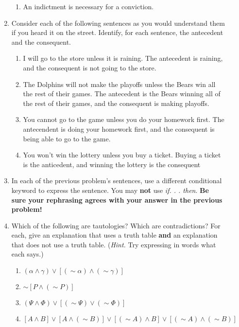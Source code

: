 \documentclass{letter}
\begin{document}
\begin{description}
\begin{enumerate}
\begin{enumerate}
			\item An indictment is necessary for a conviction. \\
		\end{enumerate}
	\item Consider each of the following sentences as you would understand them if you heard it on the street. Identify, for each sentence, the antecedent and the consequent.
			\begin{enumerate}\itemsep=1.25mm
				\item I will go to the store unless it is raining. The antecedent is raining, and the consequent is not going to the store.
				\item The Dolphins will not make the playoffs unless the Bears win all the rest of their games. The antecedent is the Bears winning all of the rest of their games, and the consequent is making playoffs. \\
				\item You cannot go to the game unless you do your homework first. The antecendent is doing your homework first, and the consequent is being able to go to the game. \\
				\item You won't win the lottery unless you buy a ticket. Buying a ticket is the anticedent, and winning the lottery is the consequent
			\end{enumerate}
	\item In each of the previous problem's sentences, use a different conditional keyword to express the sentence. You may {\bfseries not} use {\em if. . . then}. {\bfseries Be sure your rephrasing agrees with your answer in the previous problem!} \\
	\item Which of the following are tautologies? Which are contradictions? For each, give an explanation that uses a truth table {\bfseries and} an explanation that does not use a truth table. ({\em Hint.} Try expressing in words what each says.)
			\begin{enumerate}\itemsep=1.25mm
				\item $(\alpha\wedge \gamma)\vee \left[(\sim \alpha)\wedge(\sim\gamma)\right]$
				\item $\sim\left[P\wedge (\sim P)\right]$
				\item $(\Psi \wedge \Phi)\vee \left[(\sim \Psi)\vee(\sim \Phi)\right]$
				\item $[A\wedge B]\vee [A\wedge (\sim B)] \vee [(\sim A)\wedge B] \vee [(\sim A)\wedge (\sim B)]$
			\end{enumerate}

\end{enumerate}
\end{description}
\end{document}
